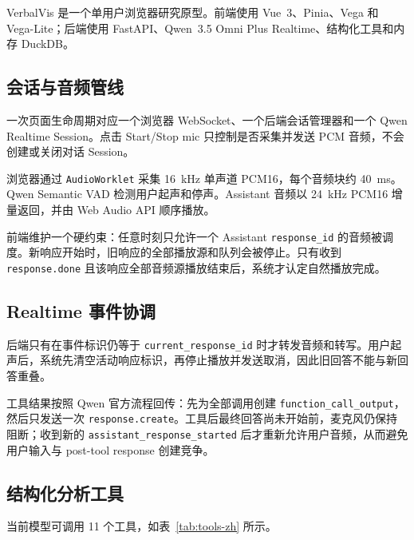 \documentclass[UTF8,a4paper,10.5pt]{ctexart}
\begin{document}
VerbalVis 是一个单用户浏览器研究原型。前端使用 Vue~3、Pinia、Vega 和 Vega-Lite；后端使用 FastAPI、Qwen~3.5 Omni Plus Realtime、结构化工具和内存 DuckDB。

\subsection{会话与音频管线}

一次页面生命周期对应一个浏览器 WebSocket、一个后端会话管理器和一个 Qwen Realtime Session。点击 Start/Stop mic 只控制是否采集并发送 PCM 音频，不会创建或关闭对话 Session。

浏览器通过 \texttt{AudioWorklet} 采集 16~kHz 单声道 PCM16，每个音频块约 40~ms。Qwen Semantic VAD 检测用户起声和停声。Assistant 音频以 24~kHz PCM16 增量返回，并由 Web Audio API 顺序播放。

前端维护一个硬约束：任意时刻只允许一个 Assistant \texttt{response\_id} 的音频被调度。新响应开始时，旧响应的全部播放源和队列会被停止。只有收到 \texttt{response.done} 且该响应全部音频源播放结束后，系统才认定自然播放完成。

\subsection{Realtime 事件协调}

后端只有在事件标识仍等于 \texttt{current\_response\_id} 时才转发音频和转写。用户起声后，系统先清空活动响应标识，再停止播放并发送取消，因此旧回答不能与新回答重叠。

工具结果按照 Qwen 官方流程回传：先为全部调用创建 \texttt{function\_call\_output}，然后只发送一次 \texttt{response.create}。工具后最终回答尚未开始前，麦克风仍保持阻断；收到新的 \texttt{assistant\_response\_started} 后才重新允许用户音频，从而避免用户输入与 post-tool response 创建竞争。

\subsection{结构化分析工具}

当前模型可调用 11 个工具，如表~\ref{tab:tools-zh} 所示。
\end{document}
